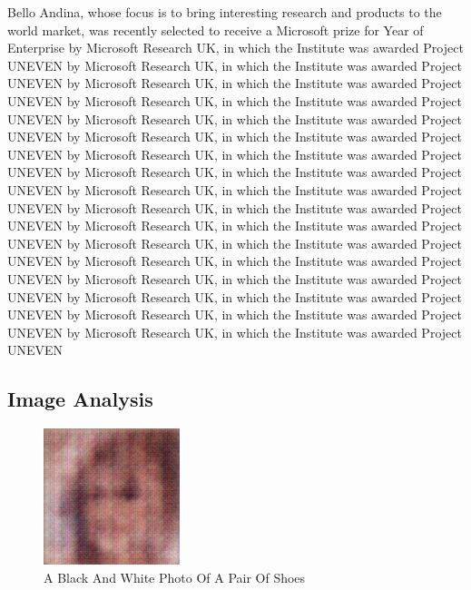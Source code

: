 \documentclass{article}%
\begin{document}
Bello Andina, whose focus is to bring interesting research and products to the world market, was recently selected to receive a Microsoft prize for Year of Enterprise by Microsoft Research UK, in which the Institute was awarded Project UNEVEN by Microsoft Research UK, in which the Institute was awarded Project UNEVEN by Microsoft Research UK, in which the Institute was awarded Project UNEVEN by Microsoft Research UK, in which the Institute was awarded Project UNEVEN by Microsoft Research UK, in which the Institute was awarded Project UNEVEN by Microsoft Research UK, in which the Institute was awarded Project UNEVEN by Microsoft Research UK, in which the Institute was awarded Project UNEVEN by Microsoft Research UK, in which the Institute was awarded Project UNEVEN by Microsoft Research UK, in which the Institute was awarded Project UNEVEN by Microsoft Research UK, in which the Institute was awarded Project UNEVEN by Microsoft Research UK, in which the Institute was awarded Project UNEVEN by Microsoft Research UK, in which the Institute was awarded Project UNEVEN by Microsoft Research UK, in which the Institute was awarded Project UNEVEN by Microsoft Research UK, in which the Institute was awarded Project UNEVEN by Microsoft Research UK, in which the Institute was awarded Project UNEVEN by Microsoft Research UK, in which the Institute was awarded Project UNEVEN by Microsoft Research UK, in which the Institute was awarded Project UNEVEN

%
\subsection{Image Analysis}%
\label{subsec:ImageAnalysis}%


\begin{figure}[h!]%
\centering%
\includegraphics[width=150px]{500_fake_images/samples_5_312.png}%
\caption{A Black And White Photo Of A Pair Of Shoes}%
\end{figure}

%
\end{document}
